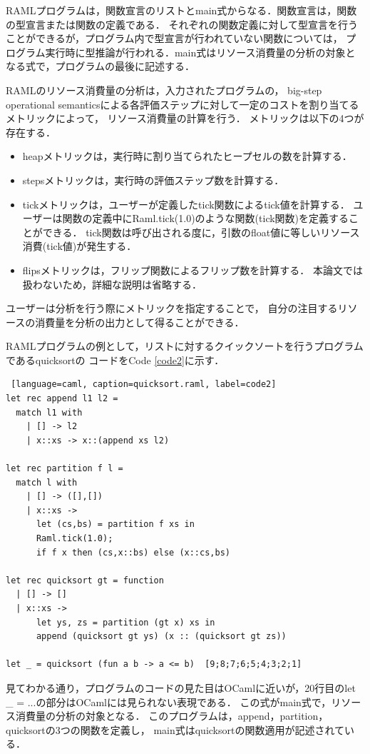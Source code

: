 \documentclass{kuisthesis}
\begin{document}
RAMLプログラムは，関数宣言のリストとmain式からなる．関数宣言は，関数の型宣言または関数の定義である．
それぞれの関数定義に対して型宣言を行うことができるが，プログラム内で型宣言が行われていない関数については，
プログラム実行時に型推論が行われる．main式はリソース消費量の分析の対象となる式で，プログラムの最後に記述する．


RAMLのリソース消費量の分析は，入力されたプログラムの，
big-step operational semanticsによる各評価ステップに対して一定のコストを割り当てるメトリックによって，
リソース消費量の計算を行う．
メトリックは以下の4つが存在する．
\begin{itemize}
  \item heapメトリックは，実行時に割り当てられたヒープセルの数を計算する．
  \item stepsメトリックは，実行時の評価ステップ数を計算する．
  \item tickメトリックは，ユーザーが定義したtick関数によるtick値を計算する．
  ユーザーは関数の定義中にRaml.tick(1.0)のような関数(tick関数)を定義することができる．
  tick関数は呼び出される度に，引数のfloat値に等しいリソース消費(tick値)が発生する．
  \item flipsメトリックは，フリップ関数によるフリップ数を計算する．
  本論文では扱わないため，詳細な説明は省略する．
\end{itemize}

ユーザーは分析を行う際にメトリックを指定することで，
自分の注目するリソースの消費量を分析の出力として得ることができる．

RAMLプログラムの例として，リストに対するクイックソートを行うプログラムであるquicksortの
コードをCode \ref{code2}に示す．
\\

\begin{lstlisting} [language=caml, caption=quicksort.raml, label=code2]
let rec append l1 l2 =
  match l1 with
    | [] -> l2
    | x::xs -> x::(append xs l2)

let rec partition f l =
  match l with
    | [] -> ([],[])
    | x::xs ->
      let (cs,bs) = partition f xs in
      Raml.tick(1.0);
      if f x then (cs,x::bs) else (x::cs,bs)

let rec quicksort gt = function
  | [] -> []
  | x::xs ->
      let ys, zs = partition (gt x) xs in
      append (quicksort gt ys) (x :: (quicksort gt zs))

let _ = quicksort (fun a b -> a <= b)  [9;8;7;6;5;4;3;2;1]
\end{lstlisting}

見てわかる通り，プログラムのコードの見た目はOCamlに近いが，20行目のlet \_ = ...の部分はOCamlには見られない表現である．
この式がmain式で，リソース消費量の分析の対象となる．
このプログラムは，append，partition，quicksortの3つの関数を定義し，
main式はquicksortの関数適用が記述されている．
\end{document}
